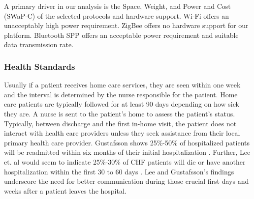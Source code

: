 A primary driver in our analysis is the Space, Weight, and Power and Cost (SWaP-C) of the selected protocols and hardware support. Wi-Fi offers an unacceptably high power requirement. ZigBee offers no hardware support for our platform. Bluetooth SPP offers an acceptable power requirement and suitable data transmission rate.

\subsubsection{Health Standards}
\label{subsubsec:HealthStandards}
Usually if a patient receives home care services, they are seen within one week and the interval is determined by the nurse responsible for the patient. Home care patients are typically followed for at least 90 days depending on how sick they are. A nurse is sent to the patient's home to assess the patient's status. Typically, between discharge and the first in-home visit, the patient does not interact with health care providers unless they seek assistance from their local primary health care provider. Gustafsson shows 25\%-50\% of hospitalized patients will be readmitted within six months of their initial hospitalization \cite{Gustafsson2004}. Further, Lee et. al would seem to indicate 25\%-30\% of CHF patients will die or have another hospitalization within the first 30 to 60 days \cite{Lee2011}. Lee and Gustafsson's findings underscore the need for better communication during those crucial first days and weeks after a patient leaves the hospital.


